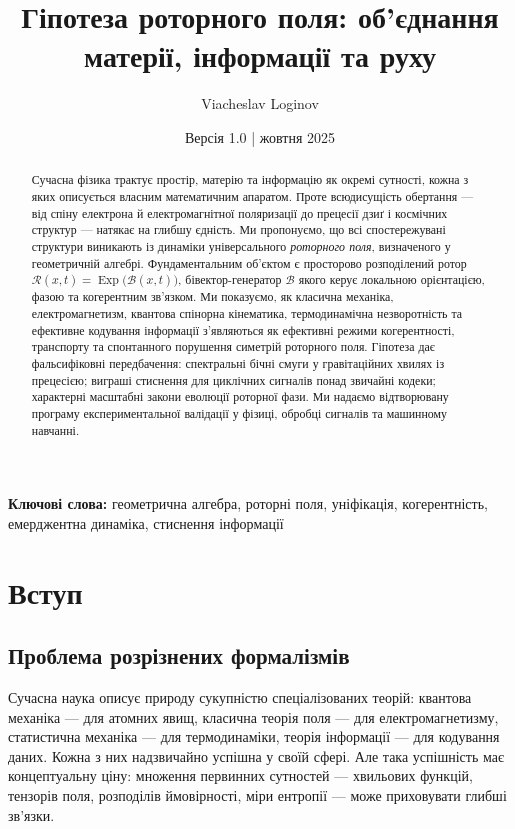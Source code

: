 \documentclass[11pt,a4paper]{article}
\title{\textbf{Гіпотеза роторного поля: об'єднання матерії, інформації та руху}}
\author[1]{Viacheslav Loginov}
\affil[1]{Київ, Україна\\ \texttt{barthez.slavik@gmail.com}}
\date{\small Версія 1.0 \quad|\quad 10 жовтня 2025}
\newcommand{\Exp}{\operatorname{Exp}}
\newcommand{\Rotor}{\mathcal{R}}
\newcommand{\Biv}{\mathcal{B}}
\theoremstyle{definition}
\theoremstyle{plain}
\theoremstyle{remark}
\begin{document}
\maketitle

\begin{abstract}
\noindent
Сучасна фізика трактує простір, матерію та інформацію як окремі сутності, кожна з яких описується власним математичним апаратом. Проте всюдисущість обертання — від спіну електрона й електромагнітної поляризації до прецесії дзиґ і космічних структур — натякає на глибшу єдність. Ми пропонуємо, що всі спостережувані структури виникають із динаміки універсального \emph{роторного поля}, визначеного у геометричній алгебрі. Фундаментальним об’єктом є просторово розподілений ротор $\Rotor(x,t)=\Exp\!\big(\Biv(x,t)\big)$, бівектор-генератор $\Biv$ якого керує локальною орієнтацією, фазою та когерентним зв’язком. Ми показуємо, як класична механіка, електромагнетизм, квантова спінорна кінематика, термодинамічна незворотність та ефективне кодування інформації з’являються як ефективні режими когерентності, транспорту та спонтанного порушення симетрій роторного поля. Гіпотеза дає фальсифіковні передбачення: спектральні бічні смуги у гравітаційних хвилях із прецесією; виграші стиснення для циклічних сигналів понад звичайні кодеки; характерні масштабні закони еволюції роторної фази. Ми надаємо відтворювану програму експериментальної валідації у фізиці, обробці сигналів та машинному навчанні.
\end{abstract}

\noindent\textbf{Ключові слова:} геометрична алгебра, роторні поля, уніфікація, когерентність, емерджентна динаміка, стиснення інформації

\vspace{1em}

\section{Вступ}

\subsection{Проблема розрізнених формалізмів}

Сучасна наука описує природу сукупністю спеціалізованих теорій: квантова механіка — для атомних явищ, класична теорія поля — для електромагнетизму, статистична механіка — для термодинаміки, теорія інформації — для кодування даних. Кожна з них надзвичайно успішна у своїй сфері. Але така успішність має концептуальну ціну: множення первинних сутностей — хвильових функцій, тензорів поля, розподілів ймовірності, міри ентропії — може приховувати глибші зв’язки.
\end{document}

